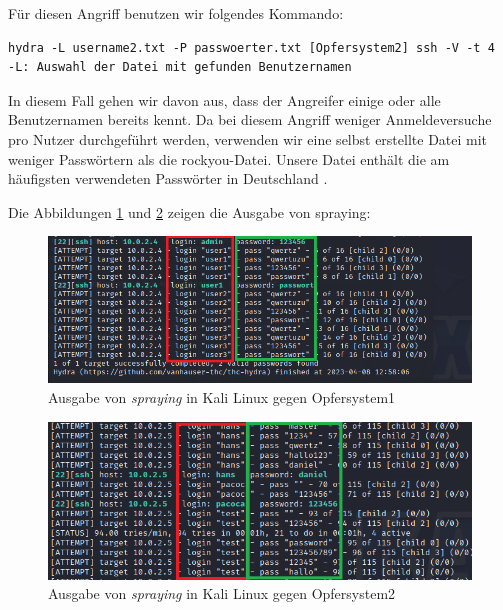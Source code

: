 Für diesen Angriff benutzen wir folgendes Kommando:
{
\begin{Verbatim}[frame=single]
hydra -L username2.txt -P passwoerter.txt [Opfersystem2] ssh -V -t 4
-L: Auswahl der Datei mit gefunden Benutzernamen
\end{Verbatim}
}

In diesem Fall gehen wir davon aus, dass der Angreifer einige oder alle Benutzernamen bereits kennt. Da bei diesem Angriff weniger Anmeldeversuche pro Nutzer durchgeführt werden, verwenden wir eine selbst erstellte Datei mit weniger Passwörtern als die \gls{rockyou}-Datei. Unsere Datei enthält die am häufigsten verwendeten Passwörter in Deutschland \citep{silicon_passwort}.

Die Abbildungen \ref{fig:spraying_opfer1} und \ref{fig:spraying_opfer2} zeigen die Ausgabe von \gls{spraying}:
\begin{figure}[H]
   \centering
   \includegraphics[width=1\textwidth]{assets/Spraying_Kali.png}
   \caption[Ausgabe von \textit{\gls{spraying}} in Kali Linux gegen Opfersystem1]
   {Ausgabe von \textit{\gls{spraying}} in Kali Linux gegen Opfersystem1}
   \label{fig:spraying_opfer1}
   \centering
\end{figure}

\begin{figure}[H]
   \centering
   \includegraphics[width=1\textwidth]{assets/Spraying_Kali2.png}
   \caption[Ausgabe von \textit{\gls{spraying}} in Kali Linux gegen Opfersystem2]
   {Ausgabe von \textit{\gls{spraying}} in Kali Linux gegen Opfersystem2}
   \label{fig:spraying_opfer2}
   \centering
\end{figure}

